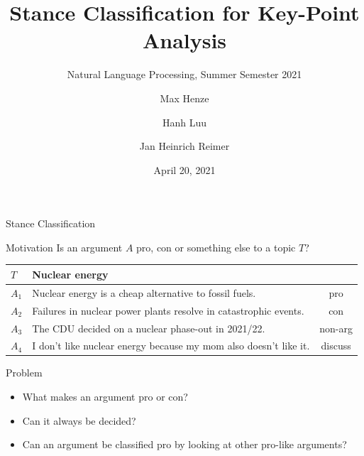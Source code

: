\documentclass[english,handout]{mlutalk}
\title{Stance Classification for Key-Point Analysis}
\subtitle{Natural Language Processing, Summer Semester 2021}
\author{Max Henze \and Hanh Luu \and Jan Heinrich Reimer}
\institute{Martin Luther University Halle-Wittenberg}
\date{April 20, 2021}
\begin{document}
\titleframe

\begin{frame}{Stance Classification}

  \begin{block}{Motivation}
    Is an argument \(A\) pro, con or something else to a topic \(T\)?
  \end{block}

  \begin{example}
    \footnotesize\centering\vspace*{1ex}
    \begin{tabular}{llc}
      \toprule
      \(T\) & Nuclear energy & \\
      \midrule
      \(A_1\) & Nuclear energy is a cheap alternative to fossil fuels. & pro \\
      \(A_2\) & Failures in nuclear power plants resolve in catastrophic events. & con \\
      \(A_3\) & The CDU decided on a nuclear phase-out in 2021/22. & non-arg \\
      \(A_4\) & I don't like nuclear energy because my mom also doesn't like it. & discuss \\
      \bottomrule
    \end{tabular}
  \end{example}

  \begin{block}{Problem}
    \begin{itemize}
      \item What makes an argument pro or con?
      \item Can it always be decided?
      \item Can an argument be classified pro by looking at other pro-like arguments?
    \end{itemize}
  \end{block}

\end{frame}
\end{document}
